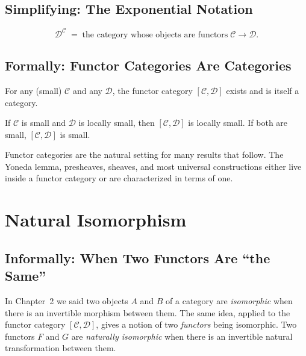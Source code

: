 \subsection{Simplifying: The Exponential Notation}

\begin{equation*}
  \mathcal{D}^{\mathcal{C}}
  \;=\; \text{the category whose objects are functors}\; \mathcal{C} \to \mathcal{D}.
\end{equation*}

\subsection{Formally: Functor Categories Are Categories}

For any (small) $\mathcal{C}$ and any $\mathcal{D}$, the functor category
$[\mathcal{C}, \mathcal{D}]$ exists and is itself a category.

If $\mathcal{C}$ is small and $\mathcal{D}$ is locally small, then
$[\mathcal{C}, \mathcal{D}]$ is locally small. If both are small,
$[\mathcal{C}, \mathcal{D}]$ is small.

Functor categories are the natural setting for many results that follow.
The Yoneda lemma, presheaves, sheaves, and most universal constructions
either live inside a functor category or are characterized in terms of one.


\section{Natural Isomorphism}
\label{sec:nat-iso}

\subsection{Informally: When Two Functors Are ``the Same''}

In Chapter~2 we said two objects $A$ and $B$ of a category are
\emph{isomorphic} when there is an invertible morphism between them. The
same idea, applied to the functor category $[\mathcal{C}, \mathcal{D}]$,
gives a notion of two \emph{functors} being isomorphic. Two functors $F$ and
$G$ are \emph{naturally isomorphic} when there is an invertible natural
transformation between them.


